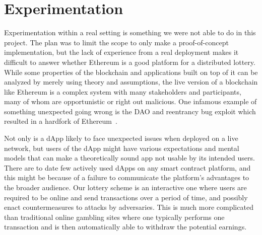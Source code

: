 \section{Experimentation}
\label{sec:experimentation}

Experimentation within a real setting is something we were not able to do in this project. The plan was to limit the scope to only make a proof-of-concept implementation, but the lack of experience from a real deployment makes it difficult to answer whether Ethereum is a good platform for a distributed lottery. While some properties of the blockchain and applications built on top of it can be analyzed by merely using theory and assumptions, the live version of a blockchain like Ethereum is a complex system with many stakeholders and participants, many of whom are opportunistic or right out malicious. One infamous example of something unexpected going wrong is the DAO and reentrancy bug exploit which resulted in a hardfork of Ethereum~\cite{dhillon_dao_2017}. 

Not only is a dApp likely to face unexpected issues when deployed on a live network, but users of the dApp might have various expectations and mental models that can make a theoretically sound app not usable by its intended users. There are to date few actively used dApps on any smart contract platform, and this might be because of a failure to communicate the platform's advantages to the broader audience. Our lottery scheme is an interactive one where users are required to be online and send transactions over a period of time, and possibly enact countermeasures to attacks by adversaries. This is much more complicated than traditional online gambling sites where one typically performs one transaction and is then automatically able to withdraw the potential earnings. 
